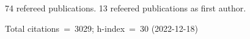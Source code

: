 74 refereed publications. 13 refeered publications as first author.

Total citations~=~3029; h-index~=~30 (2022-12-18)